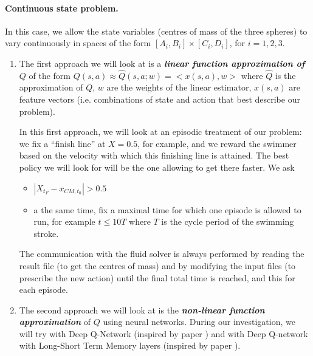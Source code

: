 \documentclass{article}
\begin{document}
\paragraph{Continuous state problem.} In this case, we allow the state variables (centres of mass of the three spheres) to vary continuously in spaces of the form $[A_i,B_i]\times[C_i,D_i]$, for $i=1,2,3$.
\begin{enumerate}
\item The first approach we will look at is  a \emph{\textbf{linear function approximation of $Q$}} of the form $Q(s,a)\approx\hat{Q}(s,a;w) = <x(s,a),w>$ where $\hat{Q}$ is the approximation of $Q$, $w$ are the weights of the linear estimator, $x(s,a)$ are feature vectors (i.e. combinations of state and action that best describe our problem).

In this first approach, we will look at an episodic treatment of our problem: we fix a ``finish line'' at $X=0.5$, for example, and we reward the swimmer based on the velocity with which this finishing line is attained. The best policy we will look for will be the one allowing to get there faster. We ask
\begin{itemize}
	\item $|X_{t_F}-x_{CM,t_0}|>0.5$  
	\item a the same time, fix a maximal time for which one episode is allowed to run, for example $t \le 10 T$ where $T$ is the cycle period of the swimming stroke. 
\end{itemize}
The communication with the fluid solver is always performed by reading the result file (to get the centres of mass) and by modifying the input files (to prescribe the new action) until the final total time is reached, and this for each episode.
\item The second approach we will look at is the \emph{\textbf{non-linear function approximation}} of $Q$ using neural networks. During our investigation, we will try with Deep Q-Network (inspired by paper \cite{novati_synchronisation_2017}) and with Deep Q-network with Long-Short Term Memory layers (inspired by paper \cite{verma_efficient_2018}).
\end{enumerate}


\end{document}
